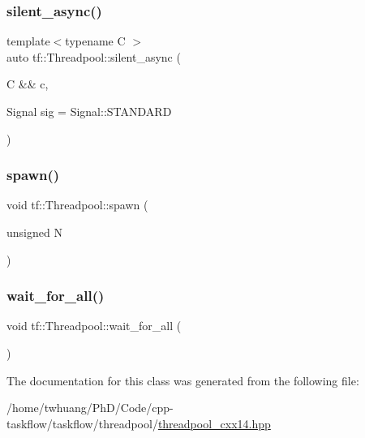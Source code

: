 \mbox{\label{classtf_1_1Threadpool_a8d6b238ef8a13beb44e392c1e77e2a43}} 
\subsubsection{\texorpdfstring{silent\+\_\+async()}{silent\_async()}}
{\footnotesize\ttfamily template$<$typename C $>$ \\
auto tf\+::\+Threadpool\+::silent\+\_\+async (\begin{DoxyParamCaption}\item[{C \&\&}]{c,  }\item[{Signal}]{sig = {\ttfamily Signal\+:\+:STANDARD} }\end{DoxyParamCaption})}

\mbox{\label{classtf_1_1Threadpool_ae80574cb4394509ba3d9b47be20825f5}} 
\subsubsection{\texorpdfstring{spawn()}{spawn()}}
{\footnotesize\ttfamily void tf\+::\+Threadpool\+::spawn (\begin{DoxyParamCaption}\item[{unsigned}]{N }\end{DoxyParamCaption})\hspace{0.3cm}{\ttfamily [inline]}}

\mbox{\label{classtf_1_1Threadpool_ad3c5d9917ee85cb792f464419dceba38}} 
\subsubsection{\texorpdfstring{wait\+\_\+for\+\_\+all()}{wait\_for\_all()}}
{\footnotesize\ttfamily void tf\+::\+Threadpool\+::wait\+\_\+for\+\_\+all (\begin{DoxyParamCaption}{ }\end{DoxyParamCaption})\hspace{0.3cm}{\ttfamily [inline]}}



The documentation for this class was generated from the following file\+:\begin{DoxyCompactItemize}
\item 
/home/twhuang/\+Ph\+D/\+Code/cpp-\/taskflow/taskflow/threadpool/\hyperlink{threadpool__cxx14_8hpp}{threadpool\+\_\+cxx14.\+hpp}\end{DoxyCompactItemize}
